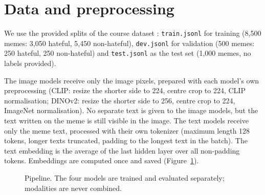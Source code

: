 \documentclass[compactaffiliation]{Interspeech}
\begin{document}
\section{Data and preprocessing}
We use the provided splits of the course dataset \cite{kiela2020hateful}: \texttt{train.jsonl} for
training (8{,}500 memes: 3{,}050 hateful, 5{,}450 non-hateful), \texttt{dev.jsonl} for validation
(500 memes: 250 hateful, 250 non-hateful) and \texttt{test.jsonl} as the test set (1{,}000 memes,
no labels provided).

The image models receive only the image pixels, prepared with each model's own preprocessing (CLIP:
resize the shorter side to 224, centre crop to 224, CLIP normalisation; DINOv2: resize the shorter
side to 256, centre crop to 224, ImageNet normalisation). No separate text is given to the image
models, but the text written on the meme is still visible in the image. The text models receive
only the meme text, processed with their own tokenizer (maximum length 128 tokens, longer texts
truncated, padding to the longest text in the batch). The text embedding is the average of the last
hidden layer over all non-padding tokens. Embeddings are computed once and saved (Figure~\ref{fig:pipeline}).

\begin{figure}[!h]
\centering
{}
\caption{Pipeline. The four models are trained and evaluated separately; modalities are never combined.}
\label{fig:pipeline}
\end{figure}
\end{document}

